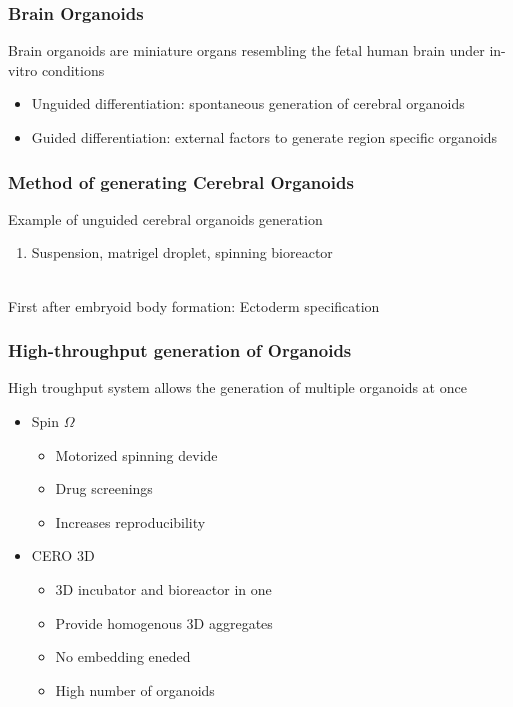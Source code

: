 \begin{itemize}
\subsubsection{Brain Organoids}
Brain organoids are miniature organs resembling the fetal human brain under in-vitro conditions
\begin{itemize}
    \item Unguided differentiation: spontaneous generation of cerebral organoids
    \item Guided differentiation: external factors to generate region specific organoids
\end{itemize}

\subsubsection{Method of generating Cerebral Organoids}
Example of unguided cerebral organoids generation
\begin{enumerate}
    \item Suspension, matrigel droplet, spinning bioreactor
\end{enumerate}
\\First after embryoid body formation: Ectoderm specification

\subsubsection{High-throughput generation of Organoids}
High troughput system allows the generation of multiple organoids at once

\begin{itemize}
    \item Spin $\Omega$
    \begin{itemize}
        \item Motorized spinning devide
        \item Drug screenings
        \item Increases reproducibility
    \end{itemize}
    \item CERO 3D
    \begin{itemize}
        \item 3D incubator and bioreactor in one
        \item Provide homogenous 3D aggregates
        \item No embedding eneded 
        \item High number of organoids
    \end{itemize}
\end{itemize}


\end{itemize}
